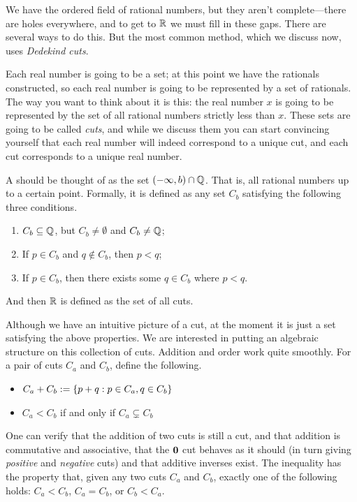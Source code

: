 \documentclass[11pt,twoside=off,numbers=noenddot]{scrbook}
\begin{document}
\begin{proofsketch}
  We have the ordered field of rational numbers, but they aren't
  complete—there are holes everywhere, and to get to $\mathbb R$ we must
  fill in these gaps. There are several ways to do this. But the most
  common method, which we discuss now, uses \textit{Dedekind cuts}.

  Each real number is going to be a set; at this point we have the
  rationals constructed, so each real number is going to be
  represented by a set of rationals. The way you want to think about
  it is this: the real number $x$ is going to be represented by the
  set of all rational numbers strictly less than $x$. These sets are
  going to be called \textit{cuts}, and while we discuss them you can
  start convincing yourself that each real number will indeed
  correspond to a unique cut, and each cut corresponds to a unique real number.

  \begin{definition}
    A  should be thought of as the set $(-\infty, b) \cap
    \mathbb Q$. That is, all rational numbers up to a certain point.
    Formally, it is defined as any set $C_b$ satisfying the following
    three conditions.
    \begin{enumerate}
      \item $C_b \subseteq \mathbb Q$, but $C_b \neq \emptyset$ and $C_b \neq \mathbb Q$;
      \item If $p \in C_b$ and $q \notin C_b$, then $p < q$;
      \item If $p \in C_b$, then there exists some $q \in C_b$ where $p < q$.
    \end{enumerate}
  \end{definition}

  And then $\mathbb R$ is defined as the set of all cuts.

  Although we have an intuitive picture of a cut, at the moment it is
  just a set satisfying the above properties. We are interested in
  putting an algebraic structure on this collection of cuts. Addition
  and order work quite smoothly. For a pair of cuts $C_a$ and $C_b$,
  define the following.
  \begin{itemize}
    \item $C_a + C_b := \{ p + q : p \in C_a, q \in C_b \}$
    \item $C_a < C_b$ if and only if $C_a \subsetneq C_b$
  \end{itemize}

  One can verify that the addition of two cuts is still a cut, and
  that addition is commutative and associative, that the $\textbf{0}$ cut
  behaves as it should (in turn giving \textit{positive} and
  \textit{negative} cuts) and that additive inverses exist. The
  inequality has the property that, given any two cuts $C_a$ and
  $C_b$, exactly one of the following holds: $C_a < C_b$, $C_a =
  C_b$, or $C_b < C_a$.


\end{proofsketch}
\end{document}
